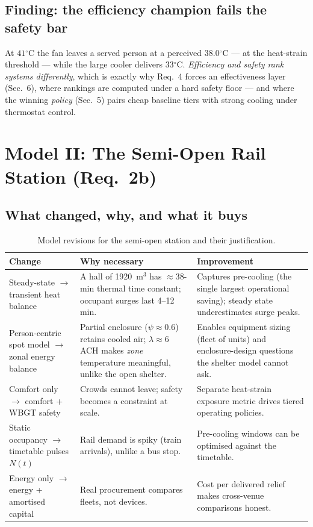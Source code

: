 \documentclass[11pt]{article}
\newcommand{\degrees}{\ensuremath{^\circ}}
\begin{document}
\subsection{Finding: the efficiency champion fails the safety bar}
At $41\degrees$C the fan leaves a served person at a perceived $38.0\degrees$C --- at the heat-strain threshold --- while the large cooler delivers $33\degrees$C. \emph{Efficiency and safety rank systems differently}, which is exactly why Req.~4 forces an effectiveness layer (Sec.~6), where rankings are computed under a hard safety floor --- and where the winning \emph{policy} (Sec.~5) pairs cheap baseline tiers with strong cooling under thermostat control.

\section{Model II: The Semi-Open Rail Station (Req.\ 2b)}
\subsection{What changed, why, and what it buys}
\begin{table}[H]\centering\small
\caption{Model revisions for the semi-open station and their justification.}\label{tab:rev}
\begin{tabular}{@{}p{3.4cm}p{4.6cm}p{6.6cm}@{}}
\toprule
Change & Why necessary & Improvement\\
\midrule
Steady-state $\to$ transient heat balance & A hall of 1920~m$^3$ has $\approx$38-min thermal time constant; occupant surges last 4--12 min. & Captures pre-cooling (the single largest operational saving); steady state underestimates surge peaks.\\
Person-centric spot model $\to$ zonal energy balance & Partial enclosure ($\psi\approx0.6$) retains cooled air; $\lambda\approx6$ ACH makes \emph{zone} temperature meaningful, unlike the open shelter. & Enables equipment sizing (fleet of units) and enclosure-design questions the shelter model cannot ask.\\
Comfort only $\to$ comfort + WBGT safety & Crowds cannot leave; safety becomes a constraint at scale. & Separate heat-strain exposure metric drives tiered operating policies.\\
Static occupancy $\to$ timetable pulses $N(t)$ & Rail demand is spiky (train arrivals), unlike a bus stop. & Pre-cooling windows can be optimised against the timetable.\\
Energy only $\to$ energy + amortised capital & Real procurement compares fleets, not devices. & Cost per delivered relief makes cross-venue comparisons honest.\\
\bottomrule
\end{tabular}
\end{table}
\end{document}
